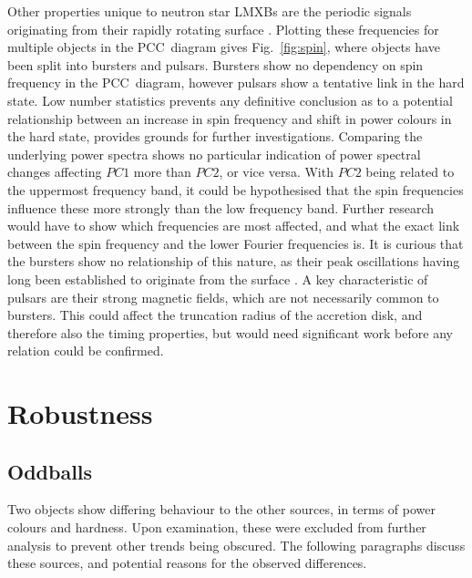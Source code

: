 Other properties unique to neutron star \acp{LMXB} are the periodic signals originating from their rapidly rotating surface \citep{watts2012thermonuclear}. Plotting these frequencies for multiple objects in the \ac{PCC}~diagram gives Fig.~\ref{fig:spin}, where objects have been split into bursters and pulsars. Bursters show no dependency on spin frequency in the \ac{PCC}~diagram, however pulsars show a tentative link in the hard state. Low number statistics prevents any definitive conclusion as to a potential relationship between an increase in spin frequency and shift in power colours in the hard state, provides grounds for further investigations. Comparing the underlying power spectra shows no particular indication of power spectral changes affecting $PC1$ more than $PC2$, or vice versa. With $PC2$ being related to the uppermost frequency band, it could be hypothesised that the spin frequencies influence these more strongly than the low frequency band. Further research would have to show which frequencies are most affected, and what the exact link between the spin frequency and the lower Fourier frequencies is. It is curious that the bursters show no relationship of this nature, as their peak oscillations having long been established to originate from the surface \citep{watts2012thermonuclear}. A key characteristic of pulsars are their strong magnetic fields, which are not necessarily common to bursters. This could affect the truncation radius of the accretion disk, and therefore also the timing properties, but would need significant work before any relation could be confirmed.

\section{Robustness}

\subsection{Oddballs}
\label{sec:oddballs}
Two objects show differing behaviour to the other sources, in terms of power colours and hardness. Upon examination, these were excluded from further analysis to prevent other trends being obscured. The following paragraphs discuss these sources, and potential reasons for the observed differences.


